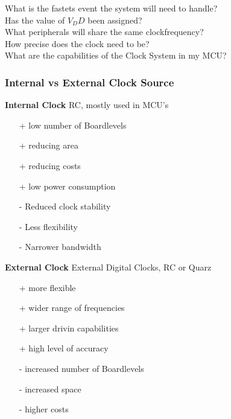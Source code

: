 What is the fastets event the system will need to handle?\\
Has the value of $ V_DD $ been assigned?\\
What peripherals will share the same clockfrequency?\\
How precise does the clock need to be?\\
What are the capabilities of the Clock System in my MCU?

\subsubsection{Internal vs External Clock Source }
\begin{multicols}{2}
    \begin{minipage}{\linewidth}
        \textbf{Internal Clock}\newline
        RC, mostly used in MCU's
        \begin{itemize}
            \item [+] low number of Boardlevels
            \item [+] reducing area
            \item [+] reducing costs
            \item [+] low power consumption
            \item [-] Reduced clock stability
            \item [-] Less flexibility
            \item [-] Narrower bandwidth
        \end{itemize}
    \end{minipage}

    \begin{minipage}{\linewidth}
    \textbf{External Clock}\newline
    External Digital Clocks, RC or Quarz
    \begin{itemize}
        \item [+] more flexible
        \item [+] wider range of frequencies
        \item [+] larger drivin capabilities
        \item [+] high level of accuracy
        \item [-] increased number of Boardlevels
        \item [-] increased space
        \item [-] higher costs
    \end{itemize}
\end{minipage}
\end{multicols}

